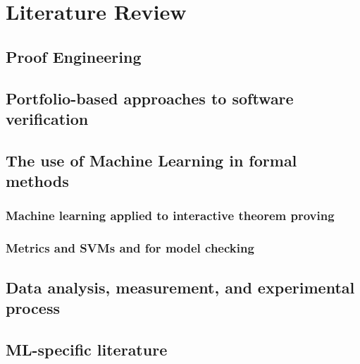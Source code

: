 \chapter{Literature Review}%

\label{LitReview} %


\section{Proof Engineering}
\section{Portfolio-based approaches to software verification}
\section{The use of Machine Learning in formal methods}
\subsection{Machine learning applied to interactive theorem proving}
\subsection{Metrics and \textsc{SVM}s and for model checking}
\section{Data analysis, measurement, and experimental process}
\section{ML-specific literature}